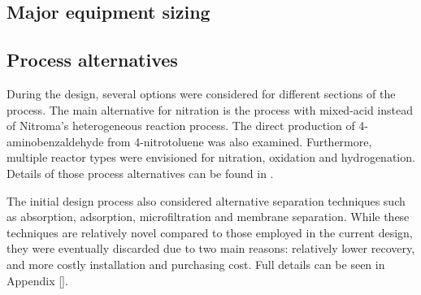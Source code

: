 \subsection{Major equipment sizing}


\subsection{Process alternatives}
During the design, several options were considered for different sections of the process. The main alternative for nitration is the process with mixed-acid instead of Nitroma's heterogeneous reaction process. The direct production of 4-aminobenzaldehyde from 4-nitrotoluene was also examined. Furthermore, multiple reactor types were envisioned for nitration, oxidation and hydrogenation. Details of those process alternatives can be found in .

The initial design process also considered alternative separation techniques such as absorption, adsorption, microfiltration and membrane separation. While these techniques are relatively novel compared to those employed in the current design, they were eventually discarded due to two main reasons: relatively lower recovery, and more costly installation and purchasing cost. Full details can be seen in Appendix [].



